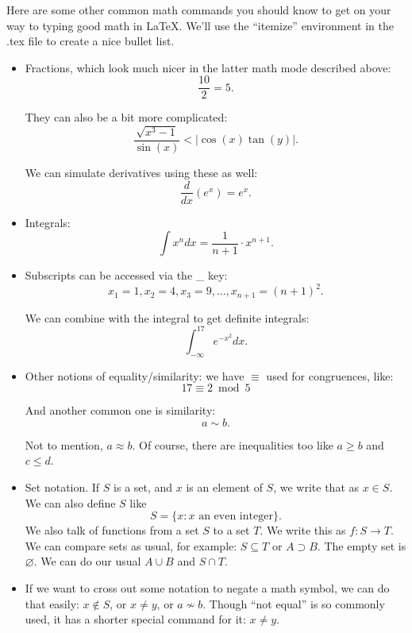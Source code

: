\documentclass[12pt]{article}
\begin{document}
	Here are some other common math commands you should know to get on your way to typing good math in \LaTeX. We'll use the ``itemize'' environment in the .tex file to create a nice bullet list. %
	\begin{itemize}
		
	\item Fractions, which look much nicer in the latter math mode described above:
	\[
	\frac{10}{2} = 5.
	\]
	
	They can also be a bit more complicated:
	\[
	\frac{\sqrt{x^3 - 1}}{\sin(x)} < |\cos(x)\tan(y)|.
	\]
	
	We can simulate derivatives using these as well:
	\[
	\frac{d}{dx}(e^x) = e^x.
	\]
	
	\item Integrals:
	\[
	\int x^n dx = \frac{1}{n+1} \cdot x^{n+1}.
	\]
	
	\item Subscripts can be accessed via the \_ key:
	\[
	x_1 = 1, x_2 = 4, x_3 = 9, ..., x_{n+1} = (n+1)^2.
	\]
	
	We can combine with the integral to get definite integrals:
	\[
	\int_{-\infty}^{17} e^{-x^2} dx.
	\]
	
	\item Other notions of equality/similarity: we have $\equiv$ used for congruences, like:
	\[
	17 \equiv 2 \bmod 5
	\]
	
	And another common one is similarity:
	\[
	a \sim b.
	\]
	
	Not to mention, $a \approx b$. Of course, there are inequalities too like $a \ge b$ and $c \le d$. 
	
	\item Set notation. If $S$ is a set, and $x$ is an element of $S$, we write that as $x \in S$. We can also define $S$ like
	\[
	S = \{ x : x \text{ an even integer} \}.
	\]
	We also talk of functions from a set $S$ to a set $T$. We write this as $f: S \to T$. We can compare sets as usual, for example: $S \subseteq T$ or $A \supset B$. The empty set is $\varnothing$. We can do our usual $A \cup B$ and $S \cap T$. 
	
	\item If we want to cross out some notation to negate a math symbol, we can do that easily: $x \not \in S$, or $x \not= y$, or $a \not \sim b$. Though ``not equal'' is so commonly used, it has a shorter special command for it: $x \neq y$. 
	
	\end{itemize}
	
\end{document}
